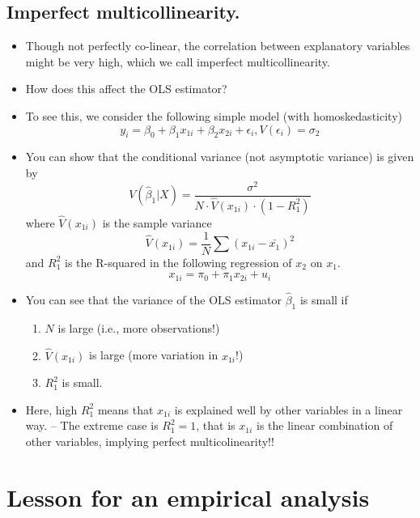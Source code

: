 \documentclass[]{book}
\providecommand{\tightlist}{%
  \setlength{\itemsep}{0pt}\setlength{\parskip}{0pt}}
\begin{document}
\subsection{Imperfect
multicollinearity.}\label{imperfect-multicollinearity.}

\begin{itemize}
\tightlist
\item
  Though not perfectly co-linear, the correlation between explanatory
  variables might be very high, which we call imperfect
  multicollinearity.
\item
  How does this affect the OLS estimator?
\item
  To see this, we consider the following simple model (with
  homoskedasticity) \[
  y_i = \beta_0 + \beta_1 x_{1i} + \beta_2 x_{2i} + \epsilon_i, V(\epsilon_i) = \sigma_2
  \]
\item
  You can show that the conditional variance (not asymptotic variance)
  is given by \[
  V(\hat\beta_1 | X) = \frac{\sigma^{2}}{N\cdot\hat{V}(x_{1i})\cdot(1-R_{1}^{2})}
  \] where \(\hat V(x_{1i})\) is the sample variance \[
  \hat V(x_{1i})  =\frac{1}{N}\sum(x_{1i}-\bar{x_{1}})^{2}
  \] and \(R_{1}^{2}\) is the R-squared in the following regression of
  \(x_2\) on \(x_1\). \[
  x_{1i} = \pi_0 + \pi_1 x_{2i} + u_i 
  \]
\item
  You can see that the variance of the OLS estimator \(\hat{\beta}_{1}\)
  is small if

  \begin{enumerate}
  \def\labelenumi{\arabic{enumi}.}
  \tightlist
  \item
    \(N\) is large (i.e., more observations!)
  \item
    \(\hat V(x_{1i})\) is large (more variation in \(x_{1i}\)!)
  \item
    \(R_{1}^{2}\) is small.
  \end{enumerate}
\item
  Here, high \(R_{1}^{2}\) means that \(x_{1i}\) is explained well by
  other variables in a linear way. -- The extreme case is
  \(R_{1}^{2}=1\), that is \(x_{1i}\) is the linear combination of other
  variables, implying perfect multicolinearity!!
\end{itemize}

\section{Lesson for an empirical
analysis}\label{lesson-for-an-empirical-analysis}
\end{document}
